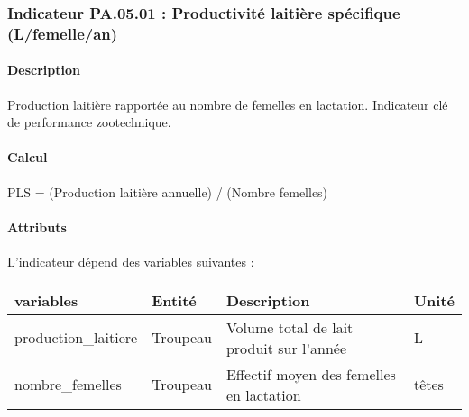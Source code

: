 \documentclass[
]{article}
\newenvironment{Shaded}{\begin{snugshade}}{\end{snugshade}}
\newcommand{\NormalTok}[1]{#1}
\begin{document}
\subsubsection{Indicateur PA.05.01 : Productivité laitière spécifique
(L/femelle/an)}\label{indicateur-pa.05.01-productivituxe9-laitiuxe8re-spuxe9cifique-lfemellean}

\paragraph{Description}\label{description-4}

Production laitière rapportée au nombre de femelles en lactation.
Indicateur clé de performance zootechnique.

\paragraph{Calcul}\label{calcul-4}

\begin{Shaded}
\begin{Highlighting}[]
\NormalTok{PLS = (Production laitière annuelle) / (Nombre femelles)}
\end{Highlighting}
\end{Shaded}

\paragraph{Attributs}\label{attributs-22}

L'indicateur dépend des variables suivantes :

\begin{longtable}[]{@{}
  >{\raggedright\arraybackslash}p{}
  >{\raggedright\arraybackslash}p{}
  >{\raggedright\arraybackslash}p{}
  >{\raggedright\arraybackslash}p{}@{}}
\toprule\noalign{}
\begin{minipage}[b]{\linewidth}\raggedright
\textbf{variables}
\end{minipage} & \begin{minipage}[b]{\linewidth}\raggedright
\textbf{Entité}
\end{minipage} & \begin{minipage}[b]{\linewidth}\raggedright
\textbf{Description}
\end{minipage} & \begin{minipage}[b]{\linewidth}\raggedright
\textbf{Unité}
\end{minipage} \\
\midrule\noalign{}
\endhead
\bottomrule\noalign{}
\endlastfoot
production\_laitiere & Troupeau & Volume total de lait produit sur
l'année & L \\
nombre\_femelles & Troupeau & Effectif moyen des femelles en lactation &
têtes \\
\end{longtable}
\end{document}
